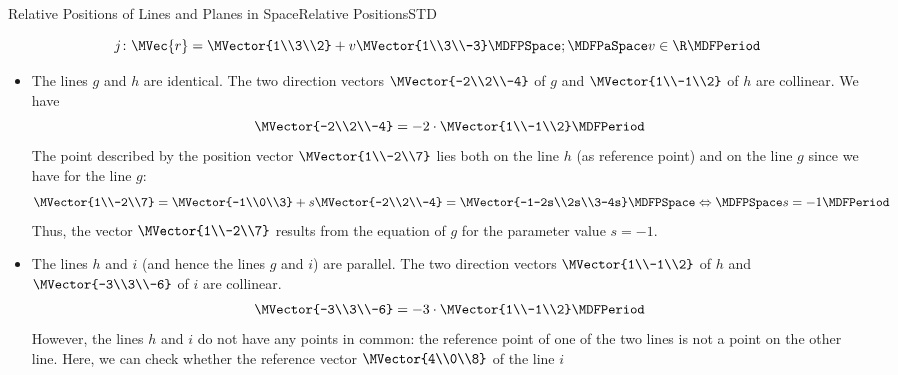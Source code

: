 \begin{MXContent}{Relative Positions of Lines and Planes in Space}{Relative Positions}{STD}
\begin{MExample}
\[
 j\colon\MVec{r}=\MVector{1\\3\\2}+v\MVector{1\\3\\-3} \MDFPSpace;\MDFPaSpace v\in\R \MDFPeriod
\]
\begin{itemize}
\item The lines $g$ and $h$ are identical. The two direction vectors $\MVector{-2\\2\\-4}$ of $g$ and 
  $\MVector{1\\-1\\2}$ of $h$ are collinear. We have
\[
  \MVector{-2\\2\\-4}= -2\cdot\MVector{1\\-1\\2} \MDFPeriod
\]
The point described by the position vector $\MVector{1\\-2\\7}$ lies both on the line $h$ (as reference point)
and on the line $g$ since we have for the line $g$:
\[
 \MVector{1\\-2\\7}=\MVector{-1\\0\\3}+s\MVector{-2\\2\\-4}=\MVector{-1-2s\\2s\\3-4s}\MDFPSpace\Leftrightarrow\MDFPSpace s=-1\MDFPeriod
\]
Thus, the vector $\MVector{1\\-2\\7}$ results from the equation of $g$ for the parameter value $s=-1$.
\item The lines $h$ and $i$ (and hence the lines $g$ and $i$) are parallel. The two direction 
vectors $\MVector{1\\-1\\2}$ of $h$ and $\MVector{-3\\3\\-6}$ of $i$ are collinear.
\[
  \MVector{-3\\3\\-6}= -3\cdot\MVector{1\\-1\\2} \MDFPeriod
\]
However, the lines $h$ and $i$ do not have any points in common:
the reference point of one of the two lines is not a point on the other line. Here, we can check whether the reference vector $\MVector{4\\0\\8}$ of the line $i$

\end{itemize}
\end{MExample}
\end{MXContent}
